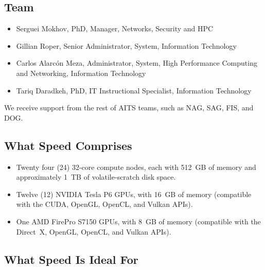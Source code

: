 \documentclass{easychair}
\begin{document}
\subsection{Team}

\begin{itemize}
	\item 
Serguei Mokhov, PhD, Manager, Networks, Security and HPC
	\item 
Gillian Roper, Senior Administrator, System, Information Technology
	\item 
Carlos Alarcón Meza, Administrator, System, High Performance Computing and Networking, Information Technology
	\item 
Tariq Daradkeh, PhD, IT Instructional Specialist, Information Technology
\end{itemize}

We receive support from the rest of AITS teams, such
as NAG, SAG, FIS, and DOG.

\subsection{What Speed Comprises}

\begin{itemize}
\item
Twenty four (24) 32-core compute nodes, each with 512~GB of memory and 
approximately 1~TB of volatile-scratch disk space. 
\item
Twelve (12) NVIDIA Tesla P6 GPUs, with 16~GB of memory (compatible with the 
CUDA, OpenGL, OpenCL, and Vulkan APIs). 

\item
One AMD FirePro S7150 GPUs, with 8~GB of memory (compatible with the
Direct~X, OpenGL, OpenCL, and Vulkan APIs). 

\end{itemize}

\subsection{What Speed Is Ideal For}
\label{sect:speed-is-for}
\end{document}
